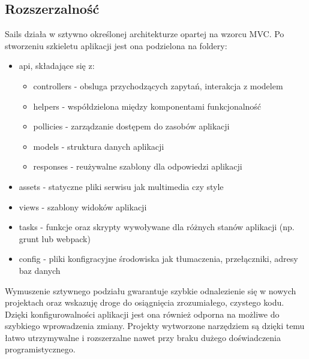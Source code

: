 \documentclass[12pt]{report}
\begin{document}
    \subsection{Rozszerzalność}
    Sails działa w sztywno określonej architekturze opartej na wzorcu MVC.
    Po stworzeniu szkieletu aplikacji jest ona podzielona na foldery:
    \begin{itemize}
      \item api, składające się z:
      \begin{itemize}
        \item controllers - obsluga przychodzących zapytań, interakcja z modelem
        \item helpers - współdzielona między komponentami funkcjonalność
        \item pollicies - zarządzanie dostępem do zasobów aplikacji
        \item models - struktura danych aplikacji
        \item responses - reużywalne szablony dla odpowiedzi aplikacji
      \end{itemize}
      \item assets - statyczne pliki serwisu jak multimedia czy style
      \item views - szablony widoków aplikacji
      \item tasks - funkcje oraz skrypty wywoływane dla różnych stanów aplikacji (np. grunt lub webpack)
      \item config - pliki konfigracyjne środowiska jak tłumaczenia, przełączniki, adresy baz danych
    \end{itemize}
    Wymuszenie sztywnego podziału gwarantuje szybkie odnalezienie się w nowych projektach oraz wskazuję droge do osiągnięcia zrozumiałego, czystego kodu.
    Dzięki konfigurowalności aplikacji jest ona również odporna na możliwe do szybkiego wprowadzenia zmiany.
    Projekty wytworzone narzędziem są dzięki temu łatwo utrzymywalne i rozszerzalne nawet przy braku dużego doświadczenia programistycznego. 
\end{document}

